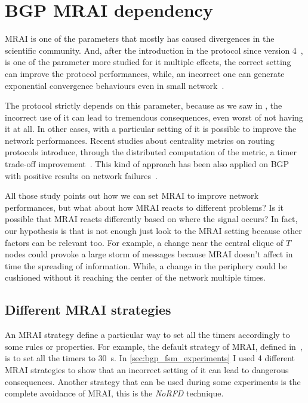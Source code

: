 \chapter{BGP MRAI dependency}
\label{cha:bgp_mrai_experiments}


\ac{MRAI} is one of the parameters that mostly has caused divergences in the
scientific community.
And, after the introduction in the protocol since version 4~\cite{rfc4271},
is one of the parameter more studied for it multiple effects, the correct setting
can improve the protocol performances, while, an incorrect one can generate
exponential convergence behaviours even in small network~\cite{fabrikant2011there,griffin2001experimental}.

The protocol strictly depends on this parameter, because as we saw in ,
the incorrect use of it can lead to tremendous consequences, even worst of not
having it at all.
In other cases, with a particular setting of it is possible to improve the network
performances.
Recent studies about centrality metrics on routing protocols introduce, through
the distributed computation of the metric, a
timer trade-off improvement~\cite{MaLo18_ToN,GhiMa18_infocom}.
This kind of approach has been also applied on \ac{BGP} with positive results on
network failures~\cite{milani2019BGP,milani2020improving}.

All those study points out how we can set \ac{MRAI} to improve network
performances, but what about how \ac{MRAI} reacts to different problems?
Is it possible that \ac{MRAI} reacts differently based on where the signal
occurs?
In fact, our hypothesis is that is not enough just look to the \ac{MRAI} setting
because other factors can be relevant too.
For example, a change near the central clique of $T$ nodes could provoke a large
storm of messages because \ac{MRAI} doesn't affect in time the spreading of information.
While, a change in the periphery could be cushioned without it reaching the center
of the network multiple times.

\section{Different MRAI strategies}
\label{sec:bgp_mrai_strategies}

An \ac{MRAI} strategy define a particular way to set all the timers accordingly
to some rules or properties.
For example, the default strategy of \ac{MRAI}, defined in~\cite{rfc4271}, is
to set all the timers to \SI{30}{\second}.
In \cref{sec:bgp_fsm_experiments} I used \num{4} different \ac{MRAI} strategies
to show that an incorrect setting of it can lead to dangerous consequences.
Another strategy that can be used during some experiments is the complete avoidance
of \ac{MRAI}, this is the \emph{NoRFD} technique.

